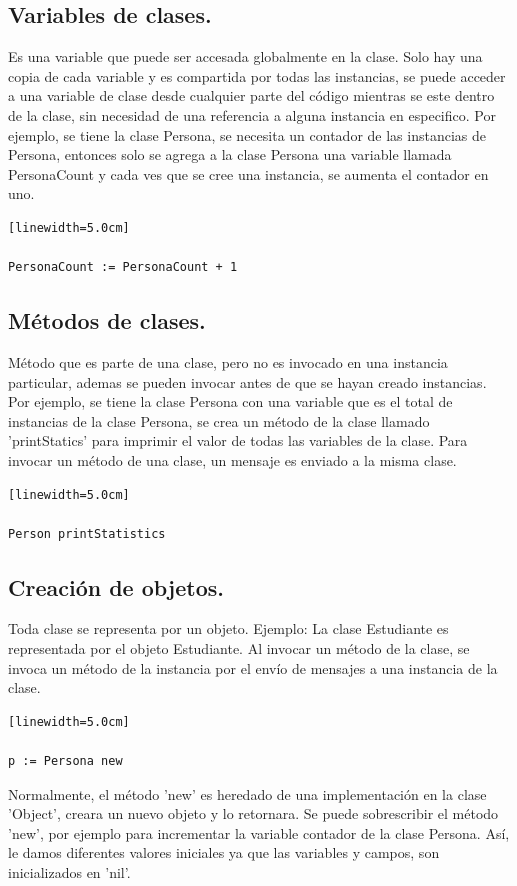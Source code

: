 \documentclass[10pt,journal,compsoc]{IEEEtran}
\begin{document}
\subsection{Variables de clases.}
Es una variable que puede ser accesada globalmente en la clase. Solo hay una copia de cada variable y es compartida por todas las instancias, se puede acceder a una variable de clase desde cualquier parte del c\'odigo mientras se este dentro de la clase, sin necesidad de una referencia a alguna instancia en especifico.
Por ejemplo, se tiene la clase Persona, se necesita un contador de las instancias de Persona, entonces solo se agrega a la clase Persona una variable llamada PersonaCount y cada ves que se cree una instancia, se aumenta el contador en uno.
\begin{lstlisting}[language=Smalltalk, caption = {Ejemplo de contador de la clase Persona.}][linewidth=5.0cm]

PersonaCount := PersonaCount + 1

\end{lstlisting}

\subsection{M\'etodos de clases.}
M\'etodo que es parte de una clase, pero no es invocado en una instancia particular, ademas se pueden invocar antes de que se hayan creado instancias.
Por ejemplo, se tiene la clase Persona con una variable que es el total de instancias de la clase Persona, se crea un m\'etodo de la clase llamado 'printStatics' para imprimir el valor de todas las variables de la clase.
Para invocar un m\'etodo de una clase, un mensaje es enviado a la misma clase.
\begin{lstlisting}[language=Smalltalk, caption = {Ejemplo de metodo de la clase Persona}][linewidth=5.0cm]

Person printStatistics

\end{lstlisting}

\subsection{Creaci\'on de objetos.}
Toda clase se representa por un objeto. Ejemplo: La clase Estudiante es representada por el objeto Estudiante. Al invocar un m\'etodo de la clase, se invoca un m\'etodo de la instancia por el env\'io de mensajes a una instancia de la clase.
\begin{lstlisting}[language=Smalltalk, caption = {Ejemplo para crear una instancia de la clase Persona.}][linewidth=5.0cm]

p := Persona new

\end{lstlisting}
Normalmente, el m\'etodo 'new' es heredado de una implementaci\'on en la clase 'Object', creara un nuevo objeto y lo retornara. Se puede sobrescribir el m\'etodo 'new', por ejemplo para incrementar la variable contador de la clase Persona. As\'i, le damos diferentes valores iniciales ya que las variables y campos, son inicializados en 'nil'.
\end{document}
